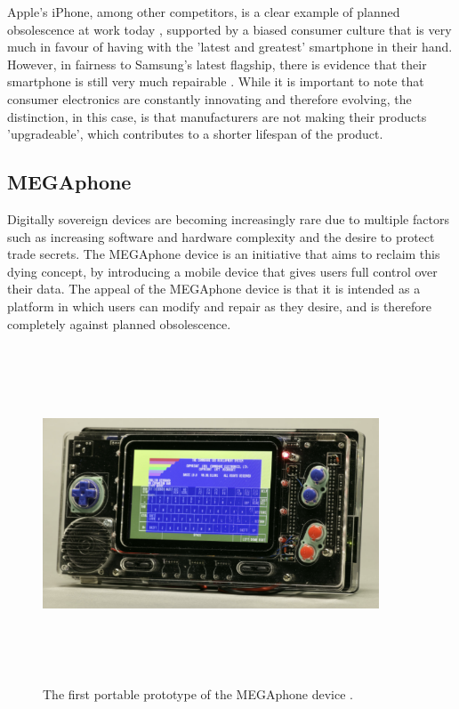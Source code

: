 Apple's iPhone, among other competitors, is a clear example of planned obsolescence at work today \cite{hugh} \cite{jerry}, supported by a biased consumer culture that is very much in favour of having with the 'latest and greatest' smartphone in their hand.
However, in fairness to Samsung's latest flagship, there is evidence that their smartphone is still very much repairable \cite{hugh2}.
While it is important to note that consumer electronics are constantly innovating and therefore evolving, the distinction, in this case, is that manufacturers are not making their products 'upgradeable', which contributes to a shorter lifespan of the product.

\subsection{MEGAphone} \label{MEGAphone}

Digitally sovereign devices are becoming increasingly rare due to multiple factors such as increasing software and hardware complexity and the desire to protect trade secrets.
The MEGAphone device is an initiative that aims to reclaim this dying concept, by introducing a mobile device that gives users full control over their data.
The appeal of the MEGAphone device is that it is intended as a platform in which users can modify and repair as they desire, and is therefore completely against planned obsolescence.

\begin{figure} [h]
    \centering
    \includegraphics[width=10cm,height=10cm,keepaspectratio]{Figures/megaphone_concept.png}
    \caption{The first portable prototype of the MEGAphone device \cite{mega65}.}
    \label{fig:MEGAphoneConcept}
\end{figure}

